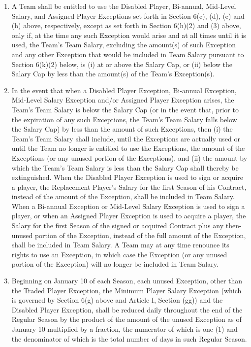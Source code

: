 \documentclass[
]{book}
\providecommand{\tightlist}{%
  \setlength{\itemsep}{0pt}\setlength{\parskip}{0pt}}
\begin{document}
\begin{enumerate}
  \begin{enumerate}
  \def\labelenumii{(\arabic{enumii})}
  \tightlist
  \item
    A Team shall be entitled to use the Disabled Player, Bi-annual, Mid-Level Salary, and Assigned Player Exceptions set forth in Section 6(c), (d), (e) and (h) above, respectively, except as set forth in Section 6(h)(2) and (3) above, only if, at the time any such Exception would arise and at all times until it is used, the Team's Team Salary, excluding the amount(s) of such Exception and any other Exception that would be included in Team Salary pursuant to Section 6(k)(2) below, is (i) at or above the Salary Cap, or (ii) below the Salary Cap by less than the amount(s) of the Team's Exception(s).
  \item
    In the event that when a Disabled Player Exception, Bi-annual Exception, Mid-Level Salary Exception and/or Assigned Player Exception arises, the Team's Team Salary is below the Salary Cap (or in the event that, prior to the expiration of any such Exceptions, the Team's Team Salary falls below the Salary Cap) by less than the amount of such Exceptions, then (i) the Team's Team Salary shall include, until the Exceptions are actually used or until the Team no longer is entitled to use the Exceptions, the amount of the Exceptions (or any unused portion of the Exceptions), and (ii) the amount by which the Team's Team Salary is less than the Salary Cap shall thereby be extinguished. When the Disabled Player Exception is used to sign or acquire a player, the Replacement Player's Salary for the first Season of his Contract, instead of the amount of the Exception, shall be included in Team Salary. When a Bi-annual Exception or Mid-Level Salary Exception is used to sign a player, or when an Assigned Player Exception is used to acquire a player, the Salary for the first Season of the signed or acquired Contract plus any then-unused portion of the Exception, instead of the full amount of the Exception, shall be included in Team Salary. A Team may at any time renounce its rights to use an Exception, in which case the Exception (or any unused portion of the Exception) will no longer be included in Team Salary.
  \item
    Beginning on January 10 of each Season, each unused Exception, other than the Traded Player Exception, the Minimum Player Salary Exception (which is governed by Section 6(g) above and Article I, Section (gg)) and the Disabled Player Exception, shall be reduced daily throughout the end of the Regular Season by the product of the amount of the unused Exception as of January 10 multiplied by a fraction, the numerator of which is one (1) and the denominator of which is the total number of days in such Regular Season.
  \end{enumerate}
\end{enumerate}
\end{document}
